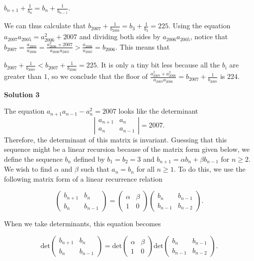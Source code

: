 \begin{enumerate}
 $b_{n+1}+\frac{1}{b_{n}}= b_{n}+\frac{1}{b_{n-1}}$.

 We can thus calculate that $b_{2007}+\frac{1}{b_{2006}}= b_{3}+\frac{1}{b_{2}}= 225$. Using the equation $a_{2007}a_{2005}=a_{2006}^{2}+2007$ and dividing both sides by $a_{2006}a_{2005}$, notice that $b_{2007}= \frac{a_{2007}}{a_{2006}}= \frac{a_{2006}^{2}+2007}{a_{2006}a_{2005}}> \frac{a_{2006}}{a_{2005}}= b_{2006}$. This means that

 $b_{2007}+\frac{1}{b_{2007}}< b_{2007}+\frac{1}{b_{2006}}= 225$. It is only a tiny bit less because all the $b_i$ are greater than $1$, so we conclude that the floor of $\frac{a_{2007}^{2}+a_{2006}^{2}}{a_{2007}a_{2006}}= b_{2007}+\frac{1}{b_{2007}}$ is $\boxed{224}$.

 



\textbf{Solution 3}

The equation $a_{n+1}a_{n-1}-a_n^2=2007$ looks like the determinant 
 \[\left|\begin{array}{cc}a_{n+1}&a_n\\a_n&a_{n-1}\end{array}\right|=2007.\]Therefore, the determinant of this matrix is invariant. Guessing that this sequence might be a linear recursion because of the matrix form given below, we define the sequence $b_n$ defined by $b_1=b_2=3$ and $b_{n+1}=\alpha b_n+\beta b_{n-1}$ for $n\ge 2$. We wish to find $\alpha$ and $\beta$ such that $a_n=b_n$ for all $n\ge 1$. To do this, we use the following matrix form of a linear recurrence relation

 
 \[\left(\begin{array}{cc}b_{n+1}&b_n\\b_n&b_{n-1}\end{array}\right)=\left(\begin{array}{cc}\alpha&\beta\\1&0\end{array}\right)\left(\begin{array}{cc}b_{n}&b_{n-1}\\b_{n-1}&b_{n-2}\end{array}\right).\] 

 When we take determinants, this equation becomes

 
 \[\text{det}\left(\begin{array}{cc}b_{n+1}&b_n\\b_n&b_{n-1}\end{array}\right)=\text{det}\left(\begin{array}{cc}\alpha&\beta\\1&0\end{array}\right)\text{det}\left(\begin{array}{cc}b_{n}&b_{n-1}\\b_{n-1}&b_{n-2}\end{array}\right).\]


\end{enumerate}
